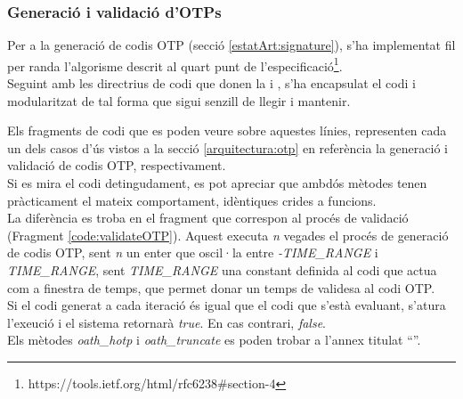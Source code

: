 \subsubsection{Generació i validació d'OTPs}
Per a la generació de codis OTP (secció \ref{estatArt:signature}), s'ha implementat fil per randa l'algorisme descrit al quart punt de l'especificació\footnote{https://tools.ietf.org/html/rfc6238#section-4}.\\
\newline Seguint amb les directrius de codi que donen la  i , s'ha encapsulat el codi i modularitzat de tal forma que sigui senzill de llegir i mantenir.
\newline Els fragments de codi que es poden veure sobre aquestes línies, representen cada un dels casos d'ús vistos a la secció \ref{arquitectura:otp} en referència la generació i validació de codis OTP, respectivament.\\
\newline Si es mira el codi detingudament, es pot apreciar que ambdós mètodes tenen pràcticament el mateix comportament, idèntiques crides a funcions.\\
\newline La diferència es troba en el fragment que correspon al procés de validació (Fragment \ref{code:validateOTP}). Aquest executa \textit{n} vegades el procés de generació de codis OTP, sent \textit{n} un enter que oscil·la entre \textit{-TIME\_RANGE} i \textit{TIME\_RANGE}, sent \textit{TIME\_RANGE} una constant definida al codi que actua com a finestra de temps, que permet donar un temps de validesa al codi OTP.\\
\newline Si el codi generat a cada iteració és igual que el codi que s'està evaluant, s'atura l'exeució i el sistema retornarà \textit{true}. En cas contrari, \textit{false}.\\
\newline Els mètodes \textit{oath\_hotp} i \textit{oath\_truncate} es poden trobar a l'annex titulat ``''.

